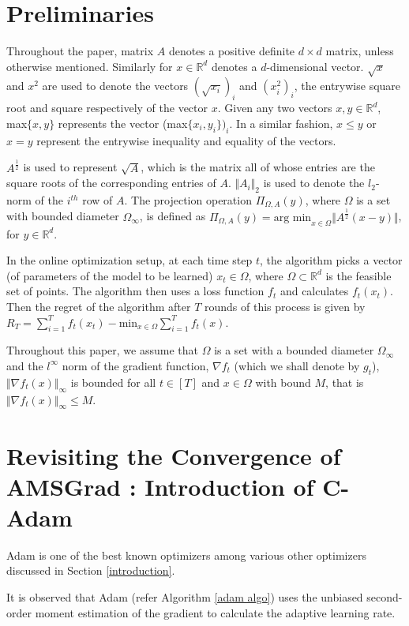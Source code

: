 \documentclass[12pt]{article}
\begin{document}
\section{Preliminaries}\label{prelim}
Throughout the paper, matrix $A$ denotes a positive definite $d\times d$ matrix, unless otherwise mentioned. Similarly for $x\in \mathbb{R}^d$ denotes a $d$-dimensional vector. $\sqrt{x}$ and $x^2$ are used to denote the vectors $(\sqrt{x_i})_i$ and $(x_i^2)_i$, the entrywise square root and square respectively of the vector $x$. Given any two vectors $x,y \in \mathbb{R}^d$, max$\{x,y\}$ represents the vector (max$\{x_i,y_i\})_i$. In a similar fashion, $x\leq y$ or $x=y$ represent the entrywise inequality and equality of the vectors.

$A^{\frac{1}{2}}$ is used to represent $\sqrt{A}$, which is the matrix all of whose entries are the square roots of the corresponding entries of $A$. $\Vert A_i\Vert_2$ is used to denote the $l_2$-norm of the $i^{th}$ row of $A$. The projection operation $\Pi_{\Omega, A}(y)$, where $\Omega$ is a set with bounded diameter $\Omega_\infty$, is defined as $\Pi_{\Omega, A}(y)=\text{arg min}_{x\in \Omega}\Vert A^{\frac{1}{2}}(x-y)\Vert$, for $y\in \mathbb{R}^d$. 


In the online optimization setup, at each time step $t$, the algorithm picks a vector (of parameters of the model to be learned) $x_t \in \Omega$, where $\Omega \subset \mathbb{R}^d$ is the feasible set of points. The algorithm then uses a loss function $f_t$ and calculates $f_t(x_t)$. Then the regret of the algorithm after $T$ rounds of this process is given by $R_T = \sum_{i=1}^T f_t(x_t) - \text{min}_{x\in \Omega} \sum_{i=1}^T f_t(x)$.

Throughout this paper, we assume that $\Omega$ is a set with a bounded diameter $\Omega_\infty$ and the $l^\infty$ norm of the gradient function, $\nabla f_t$ (which we shall denote by $g_t$), $\Vert \nabla f_t(x)\Vert_\infty$ is bounded for all $t\in [T]$ and $x\in \Omega$ with bound $M$, that is $\Vert \nabla f_t(x)\Vert_\infty\leq M$.


\section{Revisiting the Convergence of AMSGrad : Introduction of C-Adam}\label{math}
Adam is one of the best known optimizers among various other optimizers discussed in Section \ref{introduction}. 

It is observed that Adam (refer Algorithm \ref{adam algo}) uses the unbiased second-order moment estimation of the gradient to calculate the adaptive learning rate. 
\end{document}
